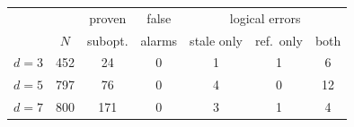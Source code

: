 \begin{tabular}{@{}lcccccc@{}}
\toprule
 & & proven & false & \multicolumn{3}{c}{logical errors} \\
 & $N$ & subopt. & alarms & stale only & ref.\ only & both \\
\midrule
$d=3$ & 452 & 24 & 0 & 1 & 1 & 6 \\
$d=5$ & 797 & 76 & 0 & 4 & 0 & 12 \\
$d=7$ & 800 & 171 & 0 & 3 & 1 & 4 \\
\bottomrule
\end{tabular}

